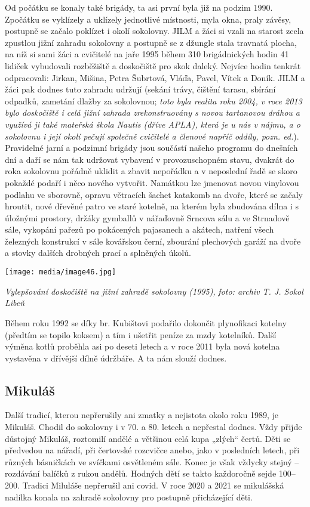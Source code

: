 Od počátku se konaly také brigády, ta asi první byla již na podzim 1990.
Zpočátku se vyklízely a uklízely jednotlivé místnosti, myla okna, praly
závěsy, postupně se začalo poklízet i okolí sokolovny. JILM a žáci si
vzali na starost zcela zpustlou jižní zahradu sokolovny a postupně se z
džungle stala travnatá plocha, na níž si sami žáci a cvičitelé na jaře
1995 během 310 brigádnických hodin 41 lidiček vybudovali rozběžiště a
doskočiště pro skok daleký. Nejvíce hodin tenkrát odpracovali: Jirkan,
Mišina, Petra Šubrtová, Vláďa, Pavel, Vítek a Doník. JILM a žáci pak
dodnes tuto zahradu udržují (sekání trávy, čištění tarasu, sbírání
odpadků, zametání dlažby za sokolovnou; \emph{toto byla realita roku
2004, v roce 2013 bylo doskočiště i celá jižní zahrada zrekonstruovány s
novou tartanovou dráhou a využívá ji také mateřská škola Nautis (dříve
APLA), která je u nás v nájmu, a o sokolovnu i její okolí pečují
společně cvičitelé a členové napříč oddíly, pozn. ed.}). Pravidelné
jarní a podzimní brigády jsou součástí našeho programu do dnešních dní a
daří se nám tak udržovat vybavení v provozuschopném stavu, dvakrát do
roka sokolovnu pořádně uklidit a zbavit nepořádku a v neposlední řadě se
skoro pokaždé podaří i něco nového vytvořit. Namátkou lze jmenovat novou
vinylovou podlahu ve sborovně, opravu větracích šachet katakomb na
dvoře, které se začaly hroutit, nové dřevěné patro ve staré kotelně, na
kterém byla zbudována dílna i s úložnými prostory, držáky gymballů v
nářaďovně Srncova sálu a ve Strnadově sále, vykopání pařezů po
pokácených pajasanech a akátech, natření všech železných konstrukcí v
sále kovářskou černí, zbourání plechových garáží na dvoře a stovky
dalších drobných prací a splněných úkolů.

\texttt{[image: media/image46.jpg]}

\emph{Vylepšování doskočiště na jižní zahradě sokolovny (1995),}
\emph{foto: archiv T. J. Sokol Libeň}

Během roku 1992 se díky br. Kubištovi podařilo dokončit plynofikaci
kotelny (předtím se topilo koksem) a tím i ušetřit peníze za mzdy
kotelníků. Další výměna kotlů proběhla asi po deseti letech a v roce
2011 byla nová kotelna vystavěna v dřívější dílně údržbáře. A ta nám
slouží dodnes.

\subsection{Mikuláš}\label{mikuluxe1ux161}

Další tradicí, kterou nepřerušily ani zmatky a nejistota okolo roku
1989, je Mikuláš. Chodil do sokolovny i v 70. a 80. letech a nepřestal
dodnes. Vždy přijde důstojný Mikuláš, roztomilí andělé a většinou celá
kupa „zlých`` čertů. Děti se předvedou na nářadí, při čertovské
rozcvičce anebo, jako v posledních letech, při různých básničkách ve
svíčkami osvětleném sále. Konec je však vždycky stejný -- rozdávání
balíčků z rukou andělů. Hodných dětí se takto každoročně sejde 100--200.
Tradici Miluláše nepřerušil ani covid. V roce 2020 a 2021 se mikulášská
nadílka konala na zahradě sokolovny pro postupně přicházející děti.

